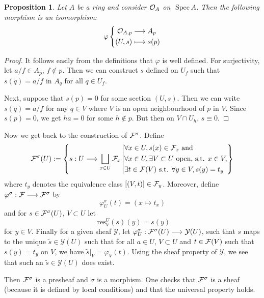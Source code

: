 \documentclass[11pt]{article}
\newtheorem{prop}[thm]{Proposition}
\newcommand{\spec}{\text{ Spec}\,}
\newcommand{\res}{\text{ res}}
\newcommand{\calf}{{\cal F}}
\newcommand{\calo}{{\cal O}}
\begin{document}
\begin{prop}
    Let $A$ be a ring and consider $\calo_A$ on $\spec A$. Then the following morphism is an isomorphism:
    $$
    \varphi
    \left\{
    \begin{aligned}
    \calo_{A,p} & \longrightarrow A_p \\
    (U,s) & \longmapsto s(p)
    \end{aligned}
    \right.
    $$
\end{prop}

\begin{proof}
    It follows easily from the definitions that $\varphi$ is well defined. For surjectivity, let $a/f\in A_p$, $f\notin p$.  Then we can construct $s$ defined on $U_f$ such that $s(q) = a/f$ in $A_q$ for all $q \in U_f$.
    
    Next, suppose that $s(p)=0$ for some section $(U,s)$. Then we can write $s(q) = a/f$ for any $q\in V$ where $V$ is an open neighbourhood of $p$ in $V$. Since $s(p)=0$, we get $ha=0$ for some $h \notin p$. But then on $V \cap U_h$, $s\equiv 0$. 
\end{proof}

Now we get back to the construction of $\calf^\sigma$. Define
$$
\calf^\sigma(U) := \left\{ 
    s: U \longrightarrow \bigsqcup_{x \in U} \calf_x \left| 
    \begin{aligned}
    & \forall x \in U, s(x) \in \calf_x \text{ and} \\
    & \forall x \in U, \exists V \subset U \text{ open, s.t. } x\in V, \\
    & \exists t \in \calf(V) \text{ s.t. } \forall y \in V, s(y) = t_y 
    \end{aligned}
    \right\} \right.
$$
where $t_y$ denotes the equivalence class $[(V,t)]\in \calf_y$.
Moreover, define $\varphi^\sigma: \calf \longrightarrow \calf^\sigma$ by 
$$
\varphi^\sigma_U(t) = (x \longmapsto t_x)
$$
and for $s \in \calf^\sigma(U)$, $V\subset U$ let 
$$
\res_V^U(s)(y) = s(y) 
$$
for $y\in V$. Finally for a given sheaf $\mathcal Y$, let $\varphi^\sigma_U: \calf^\sigma(U) \longrightarrow \mathcal Y(U)$, such that $s$ maps to the unique $\tilde s \in \mathcal Y(U)$ such that for all $a\in U$, $V\subset U$ and $t \in \calf(V)$ such that $s(y) = t_y$ on $V$, we have $\tilde s|_V = \varphi_V(t)$. Using the sheaf property of $\mathcal Y$, we see that such an $\tilde s \in \mathcal Y(U)$ does exist.

Then $\calf^\sigma$ is a presheaf and $\sigma$ is a morphism. One checks that $\calf^\sigma$ is a sheaf (because it is defined by local conditions) and that the universal property holds.
\end{document}
